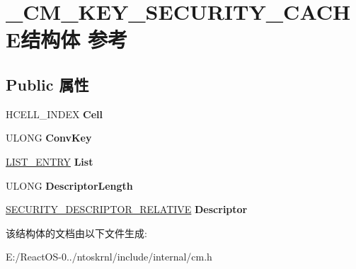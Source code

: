 \hypertarget{struct___c_m___k_e_y___s_e_c_u_r_i_t_y___c_a_c_h_e}{}\section{\+\_\+\+C\+M\+\_\+\+K\+E\+Y\+\_\+\+S\+E\+C\+U\+R\+I\+T\+Y\+\_\+\+C\+A\+C\+H\+E结构体 参考}
\label{struct___c_m___k_e_y___s_e_c_u_r_i_t_y___c_a_c_h_e}
\subsection*{Public 属性}
\begin{DoxyCompactItemize}
\item 
\mbox{\label{struct___c_m___k_e_y___s_e_c_u_r_i_t_y___c_a_c_h_e_a383c2f347cea61e83e367a771546bde6}} 
H\+C\+E\+L\+L\+\_\+\+I\+N\+D\+EX {\bfseries Cell}
\item 
\mbox{\label{struct___c_m___k_e_y___s_e_c_u_r_i_t_y___c_a_c_h_e_a58a08cb0d3e78a2abfeeeb9de2df24e6}} 
U\+L\+O\+NG {\bfseries Conv\+Key}
\item 
\mbox{\label{struct___c_m___k_e_y___s_e_c_u_r_i_t_y___c_a_c_h_e_af7f872f8017e33a015d944eb44210b96}} 
\hyperlink{struct___l_i_s_t___e_n_t_r_y}{L\+I\+S\+T\+\_\+\+E\+N\+T\+RY} {\bfseries List}
\item 
\mbox{\label{struct___c_m___k_e_y___s_e_c_u_r_i_t_y___c_a_c_h_e_a2b119e5fa3852f6c2f3f88174b1633c2}} 
U\+L\+O\+NG {\bfseries Descriptor\+Length}
\item 
\mbox{\label{struct___c_m___k_e_y___s_e_c_u_r_i_t_y___c_a_c_h_e_ab85bd65d48bd8f74e4df791752fec716}} 
\hyperlink{struct___s_e_c_u_r_i_t_y___d_e_s_c_r_i_p_t_o_r___r_e_l_a_t_i_v_e}{S\+E\+C\+U\+R\+I\+T\+Y\+\_\+\+D\+E\+S\+C\+R\+I\+P\+T\+O\+R\+\_\+\+R\+E\+L\+A\+T\+I\+VE} {\bfseries Descriptor}
\end{DoxyCompactItemize}


该结构体的文档由以下文件生成\+:\begin{DoxyCompactItemize}
\item 
E\+:/\+React\+O\+S-\/0../ntoskrnl/include/internal/cm.\+h\end{DoxyCompactItemize}
